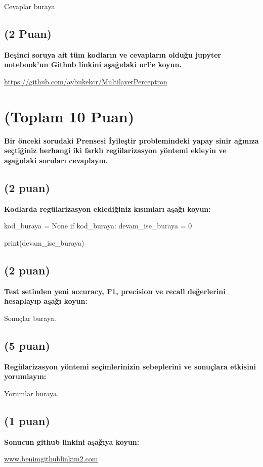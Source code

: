 \documentclass[11pt]{article}
\begin{document}
Cevaplar buraya

\subsection{(2 Puan)} \textbf{Beşinci soruya ait tüm kodların ve cevapların olduğu jupyter notebook'un Github linkini aşağıdaki url'e koyun.}

\url{https://github.com/aybukekcr/MultilayerPerceptron}

\section{(Toplam 10 Puan)} \textbf{Bir önceki sorudaki Prensesi İyileştir problemindeki yapay sinir ağınıza seçtiğiniz herhangi iki farklı regülarizasyon yöntemi ekleyin ve aşağıdaki soruları cevaplayın.} 

\subsection{(2 puan)} \textbf{Kodlarda regülarizasyon eklediğiniz kısımları aşağı koyun:} 

\begin{python}
kod_buraya = None
if kod_buraya:
    devam_ise_buraya = 0

print(devam_ise_buraya)
\end{python}

\subsection{(2 puan)} \textbf{Test setinden yeni accuracy, F1, precision ve recall değerlerini hesaplayıp aşağı koyun:}

Sonuçlar buraya.

\subsection{(5 puan)} \textbf{Regülarizasyon yöntemi seçimlerinizin sebeplerini ve sonuçlara etkisini yorumlayın:}

Yorumlar buraya.

\subsection{(1 puan)} \textbf{Sonucun github linkini  aşağıya koyun:}

\url{www.benimgithublinkim2.com}
\end{document}
